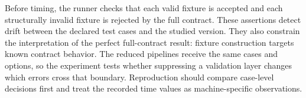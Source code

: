 Before timing, the runner checks that each valid fixture is accepted and each structurally invalid fixture is rejected by the full contract. These assertions detect drift between the declared test cases and the studied version. They also constrain the interpretation of the perfect full-contract result: fixture construction targets known contract behavior. The reduced pipelines receive the same cases and options, so the experiment tests whether suppressing a validation layer changes which errors cross that boundary. Reproduction should compare case-level decisions first and treat the recorded time values as machine-specific observations.
